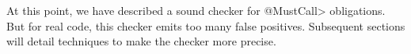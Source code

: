 At this point, we have described a sound checker for \<@MustCall> obligations.
But for real code, this checker emits too many false positives.  Subsequent
sections will detail techniques to make the checker more precise.





